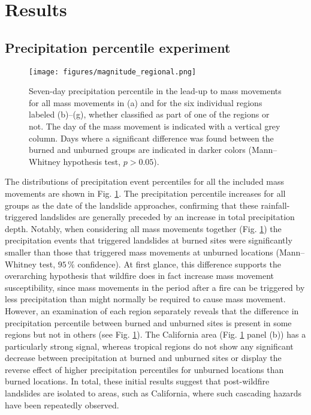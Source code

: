 \documentclass[nhess, manuscript]{copernicus}
\begin{document}
\section{Results}\label{results}

\subsection{Precipitation percentile experiment}\label{sec:result-percentile}

\begin{figure}
\centering
\texttt{[image: figures/magnitude\_regional.png]}
\caption{Seven-day precipitation percentile in the lead-up to mass movements for 
all mass movements in (a) and for the six individual regions labeled (b)--(g), whether 
classified as part of one of the regions or not. The day of the mass movement is indicated with a vertical grey column. Days where a significant difference 
was found between the burned and unburned groups are indicated in darker colors
(Mann--Whitney hypothesis test, \(p > 0.05\)).}
\label{fig:percentile}
\end{figure}

The distributions of precipitation event percentiles for all the
included mass movements are shown in Fig. \ref{fig:percentile}. The
precipitation percentile increases for all groups as the date of the
landslide approaches, confirming that these rainfall-triggered
landslides are generally preceded by an increase in total precipitation depth.
Notably, when considering all mass movements together
(Fig. \ref{fig:percentile}) the precipitation events that triggered
landslides at burned sites were significantly smaller than those that
triggered mass movements at unburned locations (Mann--Whitney test, \(95\,\%\)
confidence). At first glance, this difference supports the overarching 
hypothesis that wildfire does in
fact increase mass movement susceptibility, since mass movements in the period
after a fire can be triggered by less precipitation than might normally
be required to cause mass movement. However, an examination of each region
separately reveals that the difference in precipitation percentile
between burned and unburned sites is present in some regions but not in
others (see Fig. \ref{fig:percentile}). The California area
(Fig. \ref{fig:percentile} panel (b)) has a particularly strong signal,
whereas tropical regions do not show any significant decrease between
precipitation at burned and unburned sites or display the reverse effect
of higher precipitation percentiles for unburned locations than burned
locations. In total, these initial results suggest that post-wildfire 
landslides are isolated to areas, such as California, where such 
cascading hazards have been repeatedly observed.
\end{document}
